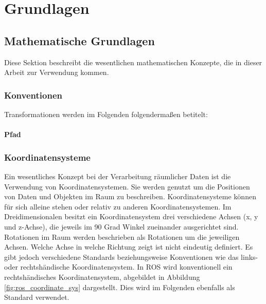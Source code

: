 \chapter{Grundlagen}


\section{Mathematische Grundlagen}

Diese Sektion beschreibt die wesentlichen mathematischen Konzepte, die in dieser Arbeit zur Verwendung kommen.

\subsection{Konventionen}

Transformationen werden im Folgenden folgendermaßen betitelt: 

\subsubsection{Pfad}


\subsection{Koordinatensysteme}

Ein wesentliches Konzept bei der Verarbeitung räumlicher Daten ist die Verwendung von Koordinatensystemen.
Sie werden genutzt um die Positionen von Daten und Objekten im Raum zu beschreiben.
Koordinatensysteme können für sich alleine stehen oder relativ zu anderen Koordinatensystemen.
Im Dreidimensionalen besitzt ein Koordinatensystem drei verschiedene Achsen (x, y und z-Achse), die jeweils im 90 Grad Winkel zueinander ausgerichtet sind.
Rotationen im Raum werden beschrieben als Rotationen um die jeweiligen Achsen.
Welche Achse in welche Richtung zeigt ist nicht eindeutig definiert.
Es gibt jedoch verschiedene Standards beziehungsweise Konventionen wie das links- oder rechtshändische Koordinatensystem.
In ROS wird konventionell ein rechtshändisches Koordinatensystem, abgebildet in Abbildung \ref{fig:ros_coordinate_sys} dargestellt. Dies wird im Folgenden ebenfalls als Standard verwendet.

